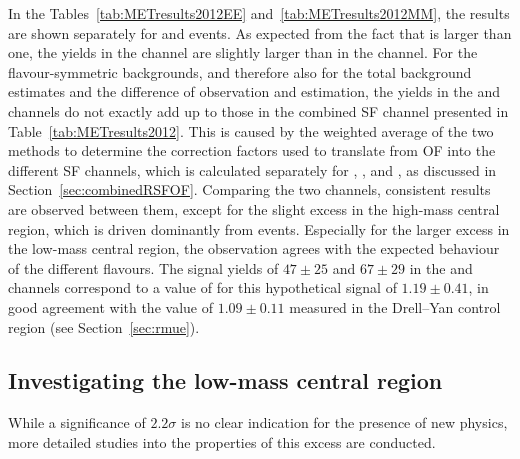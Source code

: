 
In the Tables~\ref{tab:METresults2012EE} and~\ref{tab:METresults2012MM}, the results are shown separately for \EE and \MM events. As expected from the fact that \rmue is larger than one, the yields in the \MM channel are slightly larger than in the \EE channel. For the flavour-symmetric backgrounds, and therefore also for the total background estimates and the difference of observation and estimation, the yields in the \EE and \MM channels do not exactly add up to those in the combined SF channel presented in Table~\ref{tab:METresults2012}. This is caused by the weighted average of the two methods to determine the correction factors used to translate from OF into the different SF channels, which is calculated separately for \Rsfof, \Reeof, and \Rmmof, as discussed in Section~\ref{sec:combinedRSFOF}. Comparing the two channels, consistent results are observed between them, except for the slight excess in the high-mass central region, which is driven dominantly from \EE events. Especially for the larger excess in the low-mass central region, the observation agrees with the expected behaviour of the different flavours. The signal yields of $47\pm25$ and $67\pm29$ in the \EE and \MM channels correspond to a value of \rmue for this hypothetical signal of $1.19\pm0.41$, in good agreement with the value of $1.09\pm0.11$ measured in the Drell--Yan control region (see Section~\ref{sec:rmue}).





\subsection*{Investigating the low-mass central region}
While a significance of $2.2\sigma$ is no clear indication for the presence of new physics, more detailed studies into the properties of this excess are conducted. 

